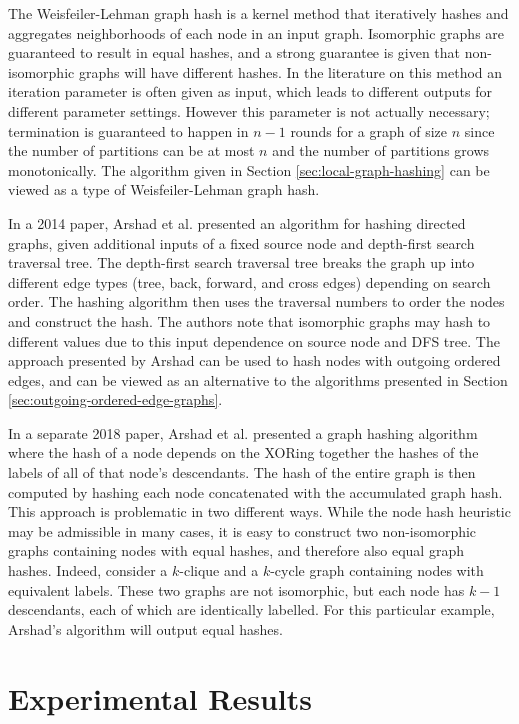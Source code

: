\documentclass[twoside,leqno]{article}
\begin{document}
The Weisfeiler-Lehman graph hash \cite{Shervashidze2011-dt} is a kernel method that iteratively hashes and aggregates neighborhoods of each node in an input graph. Isomorphic graphs are guaranteed to result in equal hashes, and a strong guarantee is given that non-isomorphic graphs will have different hashes. In the literature on this method an iteration parameter is often given as input, which leads to different outputs for different parameter settings. However this parameter is not actually necessary; termination is guaranteed to happen in $n-1$ rounds for a graph of size $n$ since the number of partitions can be at most $n$ and the number of partitions grows monotonically. The algorithm given in Section \ref{sec:local-graph-hashing} can be viewed as a type of Weisfeiler-Lehman graph hash.

In a 2014 paper, Arshad et al. \cite{Arshad2014-cc} presented an algorithm for hashing directed graphs, given additional inputs of a fixed source node and depth-first search traversal tree. The depth-first search traversal tree breaks the graph up into different edge types (tree, back, forward, and cross edges) depending on search order. The hashing algorithm then uses the traversal numbers to order the nodes and construct the hash. The authors note that isomorphic graphs may hash to different values due to this input dependence on source node and DFS tree. The approach presented by Arshad can be used to hash nodes with outgoing ordered edges, and can be viewed as an alternative to the algorithms presented in Section \ref{sec:outgoing-ordered-edge-graphs}.

In a separate 2018 paper, Arshad et al. \cite{Arshad2018-ij} presented a graph hashing algorithm where the hash of a node depends on the XORing together the hashes of the labels of all of that node's descendants. The hash of the entire graph is then computed by hashing each node concatenated with the accumulated graph hash. This approach is problematic in two different ways. While the node hash heuristic may be admissible in many cases, it is easy to construct two non-isomorphic graphs containing nodes with equal hashes, and therefore also equal graph hashes. Indeed, consider a $k$-clique and a $k$-cycle graph containing nodes with equivalent labels. These two graphs are not isomorphic, but each node has $k-1$ descendants, each of which are identically labelled. For this particular example, Arshad's algorithm will output equal hashes.

\section{Experimental Results}





\appendix
\end{document}

